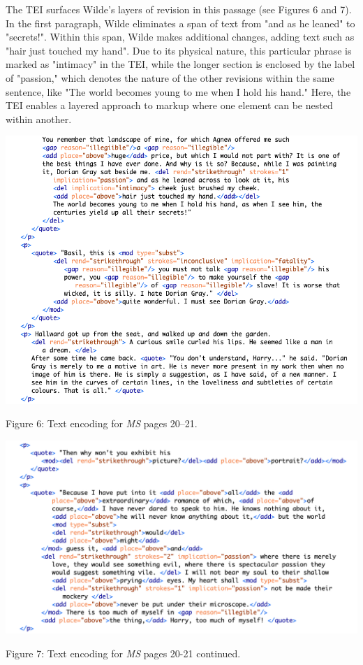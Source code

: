\documentclass[11pt]{article}
\begin{document}
The TEI surfaces Wilde's layers of revision in this passage (see
Figures 6 and 7). In the first paragraph, Wilde eliminates a span of
text from "and as he leaned" to "secrets!". Within this span, Wilde
makes additional changes, adding text such as "hair just touched my
hand". Due to its physical nature, this particular phrase is marked as
"intimacy" in the TEI, while the longer section is enclosed by the
label of "passion," which denotes the nature of the other revisions
within the same sentence, like "The world becomes young to me when I
hold his hand." Here, the TEI enables a layered approach to markup
where one element can be nested within another.

\begin{center}
\includegraphics[width=.9\linewidth]{./figure6.png}
\end{center}
Figure 6: Text encoding for \emph{MS} pages 20--21.

\begin{center}
\includegraphics[width=.9\linewidth]{./figure7.png}
\end{center}
Figure 7: Text encoding for \emph{MS} pages 20-21 continued.
\end{document}
